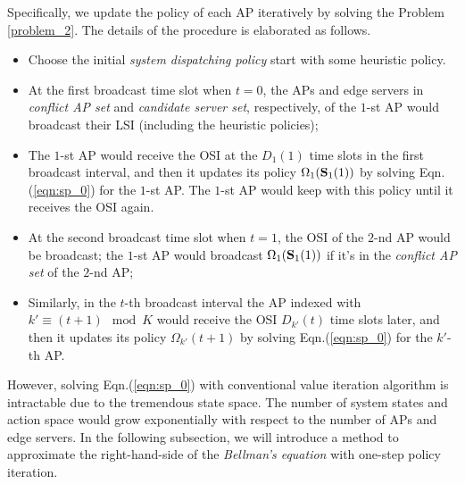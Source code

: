 Specifically, we update the policy of each AP iteratively by solving the Problem \ref{problem_2}.
The details of the procedure is elaborated as follows.
\begin{itemize}
    \item Choose the initial \emph{system dispatching policy} start with some heuristic policy.
    \item At the first broadcast time slot when $t=0$, the APs and edge servers in \emph{conflict AP set} and \emph{candidate server set}, respectively, of the $1$-st AP would broadcast their LSI (including the heuristic policies);
    \item The $1$-st AP would receive the OSI at the $D_1(1)$ time slots in the first broadcast interval, and then it updates its policy $\Omega_{1}(\mathbf{S}_{1}(1))$ by solving Eqn.(\ref{eqn:sp_0}) for the $1$-st AP.
    The $1$-st AP would keep with this policy until it receives the OSI again.
    \item At the second broadcast time slot when $t=1$, the OSI of the $2$-nd AP would be broadcast;
    the $1$-st AP would broadcast $\Omega_{1}(\mathbf{S}_{1}(1))$ if it's in the \emph{conflict AP set} of the $2$-nd AP;
    \item Similarly, in the $t$-th broadcast interval the AP indexed with $k' \equiv (t + 1)\mod{K}$ would receive the OSI $D_{k'}(t)$ time slots later, and then it updates its policy $\Omega_{k'}(t+1)$ by solving Eqn.(\ref{eqn:sp_0}) for the $k'$-th AP.
\end{itemize}

However, solving Eqn.(\ref{eqn:sp_0}) with conventional value iteration algorithm is intractable due to the tremendous state space.
The number of system states and action space would grow exponentially with respect to the number of APs and edge servers.
In the following subsection, we will introduce a method to approximate the right-hand-side of the \emph{Bellman's equation} with one-step policy iteration.

